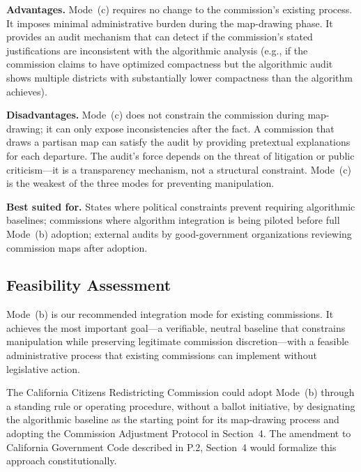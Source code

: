 \textbf{Advantages.} Mode~(c) requires no change to the commission's existing process. It imposes minimal administrative burden during the map-drawing phase. It provides an audit mechanism that can detect if the commission's stated justifications are inconsistent with the algorithmic analysis (e.g., if the commission claims to have optimized compactness but the algorithmic audit shows multiple districts with substantially lower compactness than the algorithm achieves).

\textbf{Disadvantages.} Mode~(c) does not constrain the commission during map-drawing; it can only expose inconsistencies after the fact. A commission that draws a partisan map can satisfy the audit by providing pretextual explanations for each departure. The audit's force depends on the threat of litigation or public criticism---it is a transparency mechanism, not a structural constraint. Mode~(c) is the weakest of the three modes for preventing manipulation.

\textbf{Best suited for.} States where political constraints prevent requiring algorithmic baselines; commissions where algorithm integration is being piloted before full Mode~(b) adoption; external audits by good-government organizations reviewing commission maps after adoption.

\subsection{Feasibility Assessment}

Mode~(b) is our recommended integration mode for existing commissions. It achieves the most important goal---a verifiable, neutral baseline that constrains manipulation while preserving legitimate commission discretion---with a feasible administrative process that existing commissions can implement without legislative action.

The California Citizens Redistricting Commission could adopt Mode~(b) through a standing rule or operating procedure, without a ballot initiative, by designating the algorithmic baseline as the starting point for its map-drawing process and adopting the Commission Adjustment Protocol in Section~4. The amendment to California Government Code described in P.2, Section~4 would formalize this approach constitutionally.
